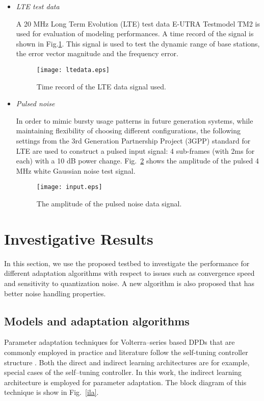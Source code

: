 \documentclass[journal]{IEEEtran}
\begin{document}
\begin{itemize}
\item \emph{LTE test data}

A 20 MHz Long Term Evolution (LTE) test data E-UTRA Testmodel TM2 \cite{3gpp} is used for evaluation of modeling performances. A time record of the signal is shown in Fig.\ref{ltedata}. This signal is used to test the dynamic range of base stations, the error vector magnitude and the frequency error.
\begin{figure}
\centering
\texttt{[image: ltedata.eps]}
\caption{Time record of the LTE data signal used.} \label{ltedata}
\end{figure}

\item \emph{Pulsed noise}

In order to mimic bursty usage patterns in future generation systems, while maintaining flexibility of choosing different configurations, the following settings from the 3rd Generation Partnership Project (3GPP) standard for LTE \cite{lte} are used to construct a pulsed input signal: 4 sub-frames (with 2ms for each) with a 10 dB power change. Fig.~\ref{input} shows the amplitude of the pulsed 4 MHz white Gaussian noise test signal.
\begin{figure}
\centering
\texttt{[image: input.eps]}
\caption{The amplitude of the pulsed noise data signal.} \label{input}
\end{figure}
\end{itemize}


\section{Investigative Results}
In this section, we use the proposed testbed to investigate the performance for different adaptation algorithms with respect to issues such as convergence speed and sensitivity to quantization noise. A new algorithm is also proposed that has better noise handling properties. 

\subsection{Models and adaptation algorithms}
Parameter adaptation techniques for Volterra--series based DPDs that are commonly employed in practice and literature follow the self-tuning controller structure \cite{paaso}. Both the direct and indirect learning architectures are for example, special cases of the self--tuning controller. In this work, the indirect learning architecture is employed for parameter adaptation. The block diagram of this technique is show in Fig.~\ref{ila}. 
\end{document}
